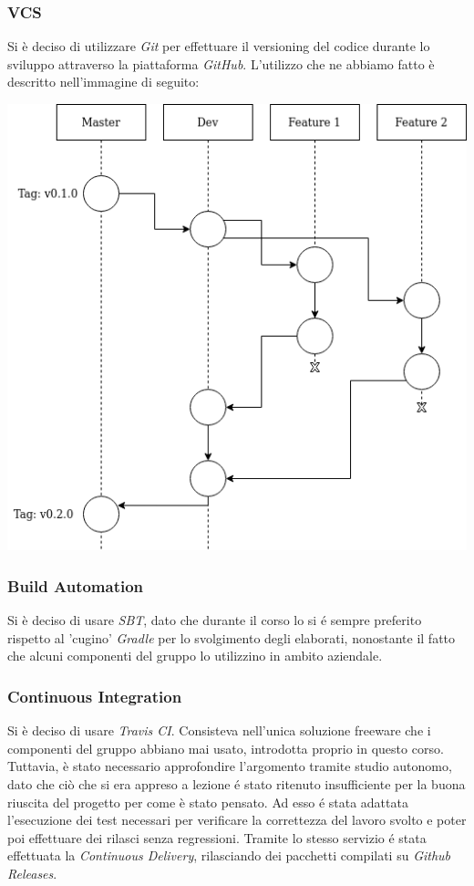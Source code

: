 \documentclass[a4paper,10pt]{article}
\begin{document}
    \subsubsection{VCS}
    Si è deciso di utilizzare \textit{Git} per effettuare il versioning del codice durante lo sviluppo attraverso la piattaforma \textit{GitHub}.
    L’utilizzo che ne abbiamo fatto è descritto nell'immagine di seguito:
    \begin{center}
        \includegraphics[scale=0.5]{git-workflow-1-1}
    \end{center}

    \subsubsection{Build Automation}
    Si è deciso di usare \textit{SBT}, dato che durante il corso lo si é sempre preferito rispetto al 'cugino' \textit{Gradle} per lo svolgimento degli elaborati, nonostante il fatto che alcuni componenti del gruppo lo utilizzino in ambito aziendale.

    \subsubsection{Continuous Integration}
    Si è deciso di usare \textit{Travis CI}.
    Consisteva nell'unica soluzione freeware che i componenti del gruppo abbiano mai usato, introdotta proprio in questo corso.
    Tuttavia, è stato necessario approfondire l'argomento tramite studio autonomo, dato che ciò che si era appreso a lezione é stato ritenuto insufficiente per la buona riuscita del progetto per come è stato pensato.
    Ad esso é stata adattata l'esecuzione dei test necessari per verificare la correttezza del lavoro svolto e poter poi effettuare dei rilasci senza regressioni.
    Tramite lo stesso servizio é stata effettuata la \textit{Continuous Delivery}, rilasciando dei pacchetti compilati su \textit{Github Releases}.
\end{document}
